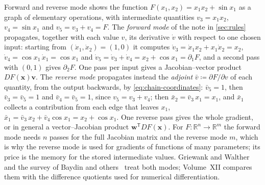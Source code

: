 \begin{note}{Forward and reverse mode}
 shows the function $F(x_1,x_2)=x_1x_2+\sin x_1$ as a graph of elementary operations, with intermediate quantities $v_3=x_1x_2$, $v_4=\sin x_1$ and $v_5=v_3+v_4=F$. The \emph{forward mode} of the note in \cref{sec:rules} propagates, together with each value $v$, its derivative $\dot v$ with respect to one chosen input: starting from $(\dot x_1,\dot x_2)=(1,0)$ it computes $\dot v_3=\dot x_1x_2+x_1\dot x_2=x_2$, $\dot v_4=\cos x_1\,\dot x_1=\cos x_1$ and $\dot v_5=\dot v_3+\dot v_4=x_2+\cos x_1=\partial_1F$, and a second pass with $(0,1)$ gives $\partial_2F$. One pass per input gives a Jacobian--vector product $DF(\mathbf x)\mathbf v$. The \emph{reverse mode} propagates instead the \emph{adjoint} $\bar v\coloneqq\partial F/\partial v$ of each quantity, from the output backwards, by \eqref{eq:chain-coordinates}: $\bar v_5=1$, then $\bar v_3=\bar v_5=1$ and $\bar v_4=\bar v_5=1$, since $v_5=v_3+v_4$; then $\bar x_2=\bar v_3\,x_1=x_1$, and $\bar x_1$ collects a contribution from each edge that leaves $x_1$, $\bar x_1=\bar v_3\,x_2+\bar v_4\cos x_1=x_2+\cos x_1$. One reverse pass gives the whole gradient, or in general a vector--Jacobian product $\mathbf w^{\mathsf T}DF(\mathbf x)$. For $F\colon\mathbb R^n\to\mathbb R^m$ the forward mode needs $n$ passes for the full Jacobian matrix and the reverse mode $m$, which is why the reverse mode is used for gradients of functions of many parameters; its price is the memory for the stored intermediate values. Griewank and Walther~\cite{griewank2008} and the survey of Baydin and others~\cite{baydin2018} treat both modes; Volume~XII compares them with the difference quotients used for numerical differentiation.
\end{note}

